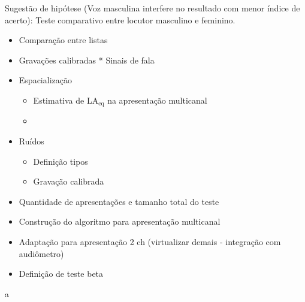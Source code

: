 Sugestão de hipótese (Voz masculina interfere no resultado com menor índice de acerto): Teste comparativo entre locutor masculino e feminino.
\begin{itemize}
    \item Comparação entre listas
    \item Gravações calibradas * Sinais de fala 
    \item Espacialização  
\begin{itemize}
    \item Estimativa de LA$_\text{eq}$ na apresentação multicanal
    \item 
\end{itemize}
    \item Ruídos  
    \begin{itemize}
    \item Definição tipos
    \item Gravação calibrada
\end{itemize}

    \item Quantidade de apresentações e tamanho total do teste
    \item Construção do algoritmo para apresentação multicanal
    \item Adaptação para apresentação 2 ch (virtualizar demais - integração com audiômetro) 
    \item Definição de teste beta
\end{itemize}
\pagebreak
a


    
    
    
    
